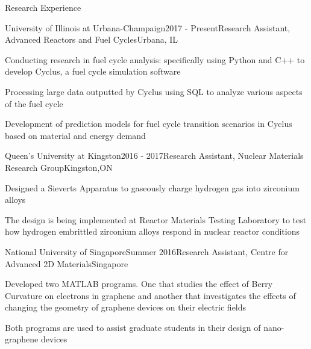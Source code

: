\documentclass{resume2} %
\begin{document}
\begin{rSection}{Research Experience}

\begin{rSubsection}{University of Illinois at Urbana-Champaign}{2017 - Present}{Research Assistant, Advanced Reactors and Fuel Cycles}{Urbana, IL}
\item Conducting research in fuel cycle analysis: specifically using Python and C++ to develop Cyclus, a fuel cycle simulation software
\item Processing large data outputted by Cyclus using SQL to analyze various aspects of the fuel cycle 
\item Development of prediction models for fuel cycle transition scenarios in Cyclus based on material and energy demand 
\end{rSubsection}

\begin{rSubsection}{Queen's University at Kingston}{2016 - 2017}{Research Assistant, Nuclear Materials Research Group}{Kingston,ON}
\item Designed a Sieverts Apparatus to gaseously charge hydrogen gas into zirconium alloys 
\item The design is being implemented at Reactor Materials Testing Laboratory to test how hydrogen embrittled zirconium alloys respond in nuclear reactor conditions
\iffalse
\item Application to nuclear industry: zirconium alloys used in nuclear reactors succumb to hydrogen embrittlement during its lifetime, therefore, it is important to be able to replicate the conditions in nuclear reactors, so as to study its end-of-life conditions
\fi
\end{rSubsection}

\begin{rSubsection}{National University of Singapore}{Summer 2016}{Research Assistant, Centre for Advanced 2D Materials}{Singapore}
	\item Developed two MATLAB programs. One that studies the effect of Berry Curvature on electrons in graphene and another that investigates the effects of changing the geometry of graphene devices on their electric fields 
	\item Both programs are used to assist graduate students in their design of nano-graphene devices
\end{rSubsection}

\iffalse
	\begin{rSubsection}{Nanyang Technological University}{2015}{Research Assistant, Polymeric Biomaterials Group}{Singapore}
	\item Involved in Biodegradable Heart Stent project. Prepared polymer specimens with varying nanoparticle concentrations and tested them to compare their mechanical strength
	\end{rSubsection}
\fi

\end{rSection}
\end{document}
